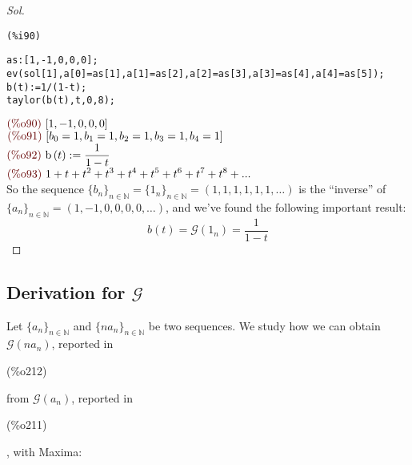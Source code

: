 \begin{proof}[Sol]
\noindent
\begin{minipage}[t]{8ex}{\color{red}\bf
\begin{verbatim}
(%i90)
\end{verbatim}}
\end{minipage}
\begin{minipage}[t]{\textwidth}{\color{blue}
\begin{verbatim}
as:[1,-1,0,0,0];
ev(sol[1],a[0]=as[1],a[1]=as[2],a[2]=as[3],a[3]=as[4],a[4]=as[5]);
b(t):=1/(1-t);
taylor(b(t),t,0,8);
\end{verbatim}}
\end{minipage}
\begin{math}\displaystyle
\parbox{8ex}{\color{labelcolor}(\%o90) }
[1,-1,0,0,0]
\end{math}\\
\begin{math}\displaystyle
\parbox{8ex}{\color{labelcolor}(\%o91) }
[{b}_{0}=1,{b}_{1}=1,{b}_{2}=1,{b}_{3}=1,{b}_{4}=1]
\end{math}\\
\begin{math}\displaystyle
\parbox{8ex}{\color{labelcolor}(\%o92) }
\mathrm{b}\left( t\right) :=\frac{1}{1-t}
\end{math}\\
\begin{math}\displaystyle
\parbox{8ex}{\color{labelcolor}(\%o93) }
1+t+{t}^{2}+{t}^{3}+{t}^{4}+{t}^{5}+{t}^{6}+{t}^{7}+{t}^{8}+...
\end{math}\\
So the sequence $\{b_n\}_{n\in\mathbb{N} } =\{1_n\}_{n\in\mathbb{N} }
=(1,1,1,1,1,1,\ldots)$ is the ``inverse'' of $\{a_n\}_{n\in\mathbb{N}
} =(1,-1,0,0,0,0,\ldots)$, and we've found the following important
result:
\begin{equation}
  \label{eq:genfun-of-ones-sequence}
  b(t) = \mathcal{G} (1_n) =  \frac{1}{1-t}
\end{equation}
\end{proof}

\subsection{Derivation for $\mathcal{G} $}

Let $\{a_n\}_{n\in\mathbb{N} }$ and $\{n a_{n}\}_{n\in\mathbb{N} } $
be two sequences. We study how we can obtain $\mathcal{G}(n a_{n}) $,
reported in \parbox{8ex}{\color{labelcolor}(\%o212) } from
$\mathcal{G} (a_n)$, reported
in \parbox{8ex}{\color{labelcolor}(\%o211) }, with Maxima:

